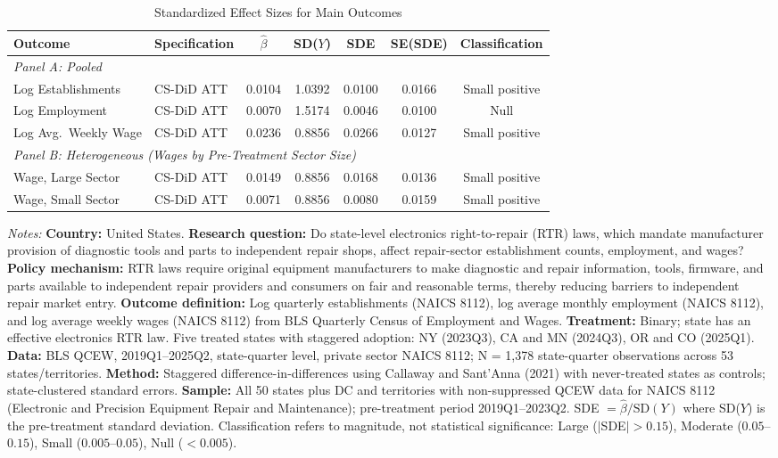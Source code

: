 \begin{table}[H]
\centering
\caption{Standardized Effect Sizes for Main Outcomes}
\label{tab:sde}
\begin{threeparttable}
\small
\begin{tabular}{llccccc}
\toprule
Outcome & Specification & $\hat{\beta}$ & SD($Y$) & SDE & SE(SDE) & Classification \\
\midrule
\multicolumn{7}{l}{\textit{Panel A: Pooled}} \\
Log Establishments & CS-DiD ATT & 0.0104 & 1.0392 & 0.0100 & 0.0166 & Small positive \\
Log Employment & CS-DiD ATT & 0.0070 & 1.5174 & 0.0046 & 0.0100 & Null \\
Log Avg.\ Weekly Wage & CS-DiD ATT & 0.0236 & 0.8856 & 0.0266 & 0.0127 & Small positive \\
\midrule
\multicolumn{7}{l}{\textit{Panel B: Heterogeneous (Wages by Pre-Treatment Sector Size)}} \\
Wage, Large Sector & CS-DiD ATT & 0.0149 & 0.8856 & 0.0168 & 0.0136 & Small positive \\
Wage, Small Sector & CS-DiD ATT & 0.0071 & 0.8856 & 0.0080 & 0.0159 & Small positive \\
\bottomrule
\end{tabular}
\begin{tablenotes}[flushleft]
\footnotesize
\item \textit{Notes:} \textbf{Country:} United States. \textbf{Research question:} Do state-level electronics right-to-repair (RTR) laws, which mandate manufacturer provision of diagnostic tools and parts to independent repair shops, affect repair-sector establishment counts, employment, and wages? \textbf{Policy mechanism:} RTR laws require original equipment manufacturers to make diagnostic and repair information, tools, firmware, and parts available to independent repair providers and consumers on fair and reasonable terms, thereby reducing barriers to independent repair market entry. \textbf{Outcome definition:} Log quarterly establishments (NAICS 8112), log average monthly employment (NAICS 8112), and log average weekly wages (NAICS 8112) from BLS Quarterly Census of Employment and Wages. \textbf{Treatment:} Binary; state has an effective electronics RTR law. Five treated states with staggered adoption: NY (2023Q3), CA and MN (2024Q3), OR and CO (2025Q1). \textbf{Data:} BLS QCEW, 2019Q1--2025Q2, state-quarter level, private sector NAICS 8112; N = 1,378 state-quarter observations across 53 states/territories. \textbf{Method:} Staggered difference-in-differences using Callaway and Sant'Anna (2021) with never-treated states as controls; state-clustered standard errors. \textbf{Sample:} All 50 states plus DC and territories with non-suppressed QCEW data for NAICS 8112 (Electronic and Precision Equipment Repair and Maintenance); pre-treatment period 2019Q1--2023Q2. SDE $= \hat{\beta} / \text{SD}(Y)$ where SD($Y$) is the pre-treatment standard deviation. Classification refers to magnitude, not statistical significance: Large ($|$SDE$| > 0.15$), Moderate ($0.05$--$0.15$), Small ($0.005$--$0.05$), Null ($< 0.005$).
\end{tablenotes}
\end{threeparttable}
\end{table}
